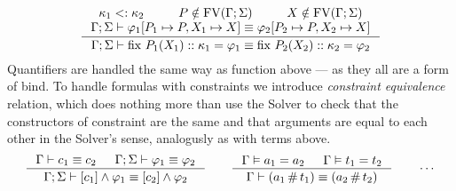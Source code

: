 \documentclass[english, mgr]{iithesis}
\renewcommand{\it}[1]{\textit{#1}}
\begin{document}
$$
  \inference{
    \kind_1 \subkind \kind_2 &
    P \notin \fv[\Gamma; \Sigma] & \termv \notin \fv[\Gamma; \Sigma] \\
    \jgmnt[\Gamma; \Sigma]{\formphi_1[P_1 \mapsto P, \termv_1 \mapsto \termv] \equiv \formphi_2[P_2 \mapsto P, \termv_2 \mapsto \termv] }
    }{
    \jgmnt[\Gamma; \Sigma]{\fix{P_1}{\termv_1}{\kind_1}\formphi_1 \equiv \fix{P_2}{\termv_2}{\kind_2}\formphi_2}
  }
$$
Quantifiers are handled the same way as function above --- as they all are a form of bind.
To handle formulas with constraints we introduce \it{constraint equivalence} relation,
which does nothing more than use the Solver to check that the constructors
of constraint are the same and that arguments are equal to each other in the Solver's sense,
analogusly as with terms above.
\\
$$
  \inference{
    \jgmnt[\Gamma]{\constr_1 \equiv \constr_2 } &
    \jgmnt[\Gamma; \Sigma]{\formphi_1 \equiv \formphi_2 }
  }{
    \jgmnt[\Gamma; \Sigma]{\fCAnd{\constr_1}\formphi_1 \equiv \fCAnd{\constr_2}\formphi_2 }
  }
\qquad
  \inference{
    \cjgmnt[\Gamma]{\atomv_1 \ceq \atomv_2 } & \cjgmnt[\Gamma]{\term_1 \ceq \term_2 }
  }{
    \jgmnt[\Gamma]{(\atomv_1 \cfresh \term_1) \equiv (\atomv_2 \cfresh \term_2) }
  }
\qquad
\cdots
$$

\end{document}
